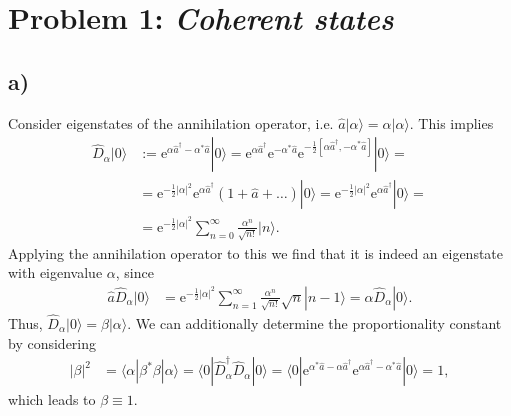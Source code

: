 \documentclass[english, parskip=full]{scrartcl}
\title{\titel}
\author{\autor}
\date{\today}
\newcommand{\braket}{}
\newcommand{\kla}{}
\newcommand{\klam}{}
\newcommand{\Ket}{}
\newcommand{\e}{\text{e}}
\begin{document}
\maketitle  %

\section*{Problem 1: \normalfont\textit{\large{Coherent states}}}
\subsection*{a)}
Consider eigenstates of the annihilation operator, i.e. $\hat{a}\Ket | \alpha \rangle=\alpha\Ket | \alpha \rangle$.
This implies
\begin{align}
\hat{D}_\alpha\Ket | 0 \rangle&:=\e^{\alpha\hat{a}^\dagger-\alpha^\ast\hat{a}}\Ket | 0 \rangle=\e^{\alpha\hat{a}^\dagger}\e^{-\alpha^\ast\hat{a}}\e^{-\frac{1}{2}\klam\left[ \alpha\hat{a}^\dagger, -\alpha^\ast\hat{a} \right]}\Ket | 0 \rangle=\\
&=\e^{-\frac{1}{2}|\alpha|^2}\e^{\alpha\hat{a}^\dagger}\kla\left( 1+\hat{a}+\dots \right)\Ket | 0 \rangle=\e^{-\frac{1}{2}|\alpha|^2}\e^{\alpha\hat{a}^\dagger}\Ket | 0 \rangle = \\
&= \e^{-\frac{1}{2}|\alpha|^2}\sum_{n=0}^\infty \frac{\alpha^n}{\sqrt{n!}}\Ket | n \rangle .
\end{align}
Applying the annihilation operator to this we find that it is indeed an eigenstate with eigenvalue $\alpha$, since
\begin{align}
\hat{a}\hat{D}_\alpha\Ket | 0 \rangle &= \e^{-\frac{1}{2}|\alpha|^2}\sum_{n=1}^\infty \frac{\alpha^n}{\sqrt{n!}}\sqrt{n}\Ket | n-1 \rangle=\alpha\hat{D}_\alpha\Ket | 0 \rangle.
\end{align}
Thus, $\hat{D}_\alpha\Ket | 0 \rangle=\beta\Ket | \alpha \rangle$.
We can additionally determine the proportionality constant by considering
\begin{align}
|\beta|^2&=\braket\langle \alpha | \beta^\ast\beta | \alpha \rangle   = \braket\langle 0 | \hat{D}_\alpha^\dagger\hat{D}_\alpha | 0 \rangle = \braket\langle 0 | \e^{\alpha^\ast\hat{a} - \alpha\hat{a}^\dagger} \e^{\alpha\hat{a}^\dagger-\alpha^\ast\hat{a}} | 0 \rangle=1,
\end{align}
which leads to $\beta\equiv 1$.
\end{document}
